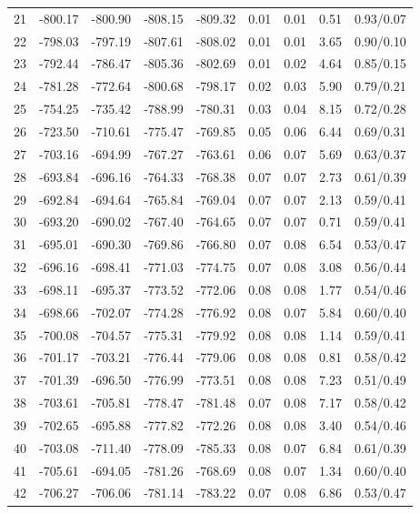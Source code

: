 \begin{tabular}{lrrrrrrrr}
21 & -800.17 & -800.90 & -808.15 & -809.32 & 0.01 & 0.01 & 0.51 & 0.93/0.07 \\
22 & -798.03 & -797.19 & -807.61 & -808.02 & 0.01 & 0.01 & 3.65 & 0.90/0.10 \\
23 & -792.44 & -786.47 & -805.36 & -802.69 & 0.01 & 0.02 & 4.64 & 0.85/0.15 \\
24 & -781.28 & -772.64 & -800.68 & -798.17 & 0.02 & 0.03 & 5.90 & 0.79/0.21 \\
25 & -754.25 & -735.42 & -788.99 & -780.31 & 0.03 & 0.04 & 8.15 & 0.72/0.28 \\
26 & -723.50 & -710.61 & -775.47 & -769.85 & 0.05 & 0.06 & 6.44 & 0.69/0.31 \\
27 & -703.16 & -694.99 & -767.27 & -763.61 & 0.06 & 0.07 & 5.69 & 0.63/0.37 \\
28 & -693.84 & -696.16 & -764.33 & -768.38 & 0.07 & 0.07 & 2.73 & 0.61/0.39 \\
29 & -692.84 & -694.64 & -765.84 & -769.04 & 0.07 & 0.07 & 2.13 & 0.59/0.41 \\
30 & -693.20 & -690.02 & -767.40 & -764.65 & 0.07 & 0.07 & 0.71 & 0.59/0.41 \\
31 & -695.01 & -690.30 & -769.86 & -766.80 & 0.07 & 0.08 & 6.54 & 0.53/0.47 \\
32 & -696.16 & -698.41 & -771.03 & -774.75 & 0.07 & 0.08 & 3.08 & 0.56/0.44 \\
33 & -698.11 & -695.37 & -773.52 & -772.06 & 0.08 & 0.08 & 1.77 & 0.54/0.46 \\
34 & -698.66 & -702.07 & -774.28 & -776.92 & 0.08 & 0.07 & 5.84 & 0.60/0.40 \\
35 & -700.08 & -704.57 & -775.31 & -779.92 & 0.08 & 0.08 & 1.14 & 0.59/0.41 \\
36 & -701.17 & -703.21 & -776.44 & -779.06 & 0.08 & 0.08 & 0.81 & 0.58/0.42 \\
37 & -701.39 & -696.50 & -776.99 & -773.51 & 0.08 & 0.08 & 7.23 & 0.51/0.49 \\
38 & -703.61 & -705.81 & -778.47 & -781.48 & 0.07 & 0.08 & 7.17 & 0.58/0.42 \\
39 & -702.65 & -695.88 & -777.82 & -772.26 & 0.08 & 0.08 & 3.40 & 0.54/0.46 \\
40 & -703.08 & -711.40 & -778.09 & -785.33 & 0.08 & 0.07 & 6.84 & 0.61/0.39 \\
41 & -705.61 & -694.05 & -781.26 & -768.69 & 0.08 & 0.07 & 1.34 & 0.60/0.40 \\
42 & -706.27 & -706.06 & -781.14 & -783.22 & 0.07 & 0.08 & 6.86 & 0.53/0.47 \\

\end{tabular}
